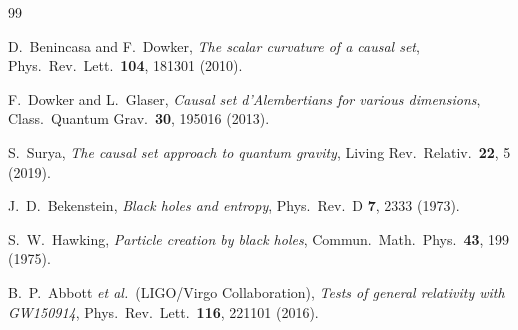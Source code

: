\documentclass[11pt,a4paper]{article}
\theoremstyle{remark}
\begin{document}
\begin{thebibliography}{99}

  D.~Benincasa and F.~Dowker,
  \emph{The scalar curvature of a causal set},
  Phys.\ Rev.\ Lett.\ \textbf{104}, 181301 (2010).

  F.~Dowker and L.~Glaser,
  \emph{Causal set d'Alembertians for various dimensions},
  Class.\ Quantum Grav.\ \textbf{30}, 195016 (2013).

  S.~Surya,
  \emph{The causal set approach to quantum gravity},
  Living Rev.\ Relativ.\ \textbf{22}, 5 (2019).

  J.~D.~Bekenstein,
  \emph{Black holes and entropy},
  Phys.\ Rev.\ D \textbf{7}, 2333 (1973).

  S.~W.~Hawking,
  \emph{Particle creation by black holes},
  Commun.\ Math.\ Phys.\ \textbf{43}, 199 (1975).

  B.~P.~Abbott \emph{et al.}\ (LIGO/Virgo Collaboration),
  \emph{Tests of general relativity with GW150914},
  Phys.\ Rev.\ Lett.\ \textbf{116}, 221101 (2016).

\end{thebibliography}
\end{document}
